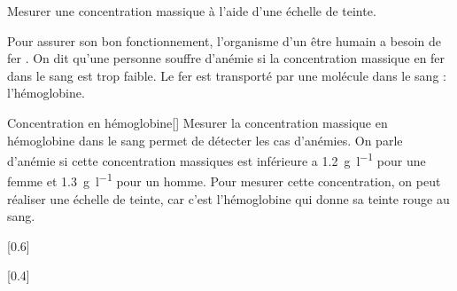\teteSndSolu

\vspace*{-36pt}

\begin{objectifs}
  \item Mesurer une concentration massique à l'aide d'une échelle de teinte.
\end{objectifs}


\begin{contexte}
  Pour assurer son bon fonctionnement, l'organisme d'un être humain a besoin de fer .
  On dit qu'une personne souffre d'anémie si la concentration massique en fer dans le sang est trop faible.
  Le fer est transporté par une molécule dans le sang : l'hémoglobine.

\end{contexte}


\begin{doc}{Concentration en hémoglobine}[\label{doc:anemie}]
  Mesurer la concentration massique en hémoglobine dans le sang permet de détecter les cas d'anémies.
  On parle d'anémie si cette concentration massiques est inférieure a
  \qty{1,2}{\g\per\litre} pour une femme et \qty{1,3}{\g\per\litre} pour un homme.
  Pour mesurer cette concentration, on peut réaliser une échelle de teinte, car c'est l'hémoglobine qui donne sa teinte rouge au sang.

  [0.6]{
    \begin{center}
  
    \end{center}
  }[0.4]
\end{doc}

